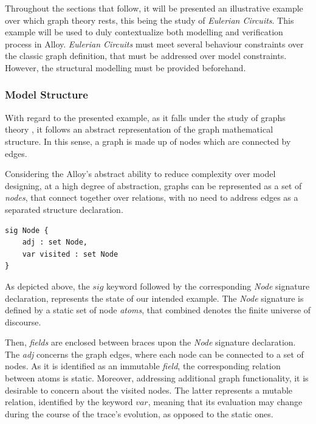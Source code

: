 Throughout the sections that follow, it will be presented an illustrative example over which graph theory rests, this being the study of \textit{Eulerian Circuits}. This example will be used to duly contextualize both modelling and verification process in Alloy. \textit{Eulerian Circuits} must meet several behaviour constraints over the classic graph definition, that must be addressed over model constraints. However, the structural modelling must be provided beforehand.

\subsubsection{Model Structure}

With regard to the presented example, as it falls under the study of graphs theory \cite{west2001introduction}, it follows an abstract representation of the graph mathematical structure. In this sense, a graph is made up of nodes which are connected by edges. 

Considering the Alloy's abstract ability to reduce complexity over model designing, at a high degree of abstraction, graphs can be represented as a set of \textit{nodes}, that connect together over relations, with no need to address edges as a separated structure declaration. 

\begin{lstlisting}[title={Graph representation over a sigle Node declaration.}, otherkeywords = {abstract, sig, module, var, set, fact, extends, no, in}, label={lst:node},floatplacement=H]
sig Node {
    adj : set Node, 
    var visited : set Node
}
\end{lstlisting}

As depicted above, the $sig$ keyword followed by the corresponding \textit{Node} signature declaration, represents the state of our intended example. The \textit{Node} signature is defined by a static set of node \textit{atoms}, that combined denotes the finite universe of discourse.

Then, \textit{fields} are enclosed between braces upon the \textit{Node} signature declaration. The \textit{adj} concerns the graph edges, where each node can be connected to a set of nodes. As it is identified as an immutable \textit{field}, the corresponding relation between atoms is static. Moreover, addressing additional graph functionality, it is desirable to concern about the visited nodes. The latter represents a mutable relation, identified by the keyword $var$, meaning that its evaluation may change during the course of the trace's evolution, as opposed to the static ones. 

